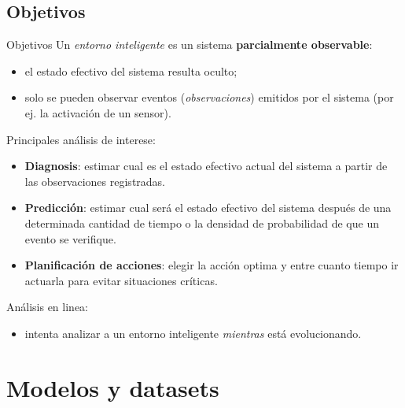 \documentclass[9pt, handout]{beamer}
\begin{document}
    \subsection{Objetivos}
      \begin{frame}{Objetivos}
        \pause
        Un \textit{entorno inteligente} es un sistema \textbf{parcialmente observable}:
        \pause
        \begin{itemize}
          \item el estado efectivo del sistema resulta oculto;
          \pause
          \item solo se pueden observar eventos (\textit{observaciones}) emitidos por el sistema (por ej. la activación de un sensor).
        \end{itemize}
        
        \vspace{1em}
        \pause
        Principales análisis de interese:
        \pause
        \begin{itemize}
          \item \textbf{Diagnosis}: estimar cual es el estado efectivo actual del sistema a partir de las observaciones registradas.
          \pause
          \item \textbf{Predicción}: estimar cual será el estado efectivo del sistema después de una determinada cantidad de tiempo o la densidad de probabilidad de que un evento se verifique.
          \item \textbf{Planificación de acciones}: elegir la acción optima y entre cuanto tiempo ir actuarla para evitar situaciones críticas.
        \end{itemize}
        
        \vspace{1em}
        \pause
        Análisis en linea:
        \pause
        \begin{itemize}
          \item intenta analizar a un entorno inteligente \textit{mientras} está evolucionando.
        \end{itemize}
      \end{frame}
    
  \section{Modelos y datasets}
\end{document}
